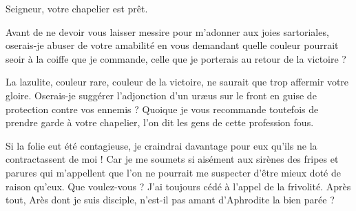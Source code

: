 \begin{drama}
  \intrat{\page}

  \pagespeaks {} Seigneur, votre chapelier est prêt.

  \generalspeaks Avant de ne devoir vous laisser messire \elena{} pour m’adonner aux joies sartoriales, oserais-je abuser de votre amabilité en vous demandant quelle couleur pourrait seoir à la coiffe que je commande, celle que je porterais au retour de la victoire ?

  \elenaspeaks La lazulite, couleur rare, couleur de la victoire, ne saurait que trop affermir votre gloire. Oserais-je suggérer l’adjonction d’un uræus sur le front en guise de protection contre vos ennemis ? Quoique je vous recommande toutefois de prendre garde à votre chapelier, l’on dit les gens de cette profession fous.

  \generalspeaks   Si la folie eut été contagieuse, je craindrai davantage pour eux  qu’ils ne la contractassent de moi ! Car je me soumets si aisément aux sirènes des fripes et parures qui m’appellent que l’on ne pourrait me suspecter d’être mieux doté de raison qu’eux. Que voulez-vous ? J’ai toujours cédé à l’appel de la frivolité. Après tout, Arès dont je suis disciple, n’est-il pas amant d’Aphrodite la bien parée ?


  \exit{\general}

\end{drama}

\scene

\StageDirII{\elena, \alexas}


